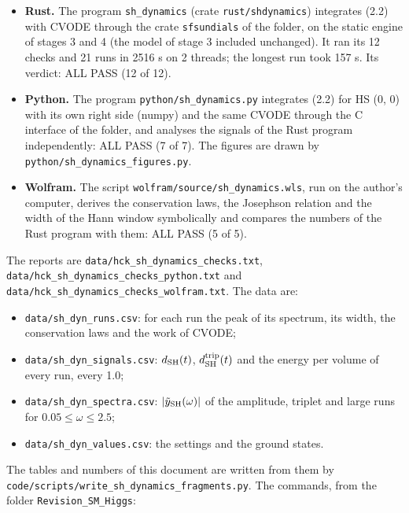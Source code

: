 \documentclass[
  10pt,
]{article}
\providecommand{\tightlist}{%
  \setlength{\itemsep}{0pt}\setlength{\parskip}{0pt}}
\begin{document}
\begin{itemize}
\tightlist
\item
  \textbf{Rust.} The program \texttt{sh\_dynamics} (crate
  \texttt{rust/shdynamics}) integrates (2.2) with CVODE through the
  crate \texttt{sfsundials} of the folder, on the static engine of
  stages 3 and 4 (the model of stage 3 included unchanged). It ran its
  12 checks and 21 runs in 2516 s on 2 threads; the longest run took 157
  s. Its verdict: ALL PASS (12 of 12).
\item
  \textbf{Python.} The program \texttt{python/sh\_dynamics.py}
  integrates (2.2) for HS (0, 0) with its own right side (numpy) and the
  same CVODE through the C interface of the folder, and analyses the
  signals of the Rust program independently: ALL PASS (7 of 7). The
  figures are drawn by \texttt{python/sh\_dynamics\_figures.py}.
\item
  \textbf{Wolfram.} The script \texttt{wolfram/source/sh\_dynamics.wls},
  run on the author's computer, derives the conservation laws, the
  Josephson relation and the width of the Hann window symbolically and
  compares the numbers of the Rust program with them: ALL PASS (5 of 5).
\end{itemize}

The reports are \texttt{data/hck\_sh\_dynamics\_checks.txt},
\texttt{data/hck\_sh\_dynamics\_checks\_python.txt} and
\texttt{data/hck\_sh\_dynamics\_checks\_wolfram.txt}. The data are:

\begin{itemize}
\tightlist
\item
  \texttt{data/sh\_dyn\_runs.csv}: for each run the peak of its
  spectrum, its width, the conservation laws and the work of CVODE;
\item
  \texttt{data/sh\_dyn\_signals.csv}: \(d_{\rm SH}(t)\),
  \(d^{\rm trip}_{\rm SH}(t)\) and the energy per volume of every run,
  every 1.0;
\item
  \texttt{data/sh\_dyn\_spectra.csv}:
  \(\lvert\tilde y_{\rm SH}(\omega)\rvert\) of the amplitude, triplet
  and large runs for \(0.05\le\omega\le2.5\);
\item
  \texttt{data/sh\_dyn\_values.csv}: the settings and the ground states.
\end{itemize}

The tables and numbers of this document are written from them by
\texttt{code/scripts/write\_sh\_dynamics\_fragments.py}. The commands,
from the folder \texttt{Revision\_SM\_Higgs}:
\end{document}
